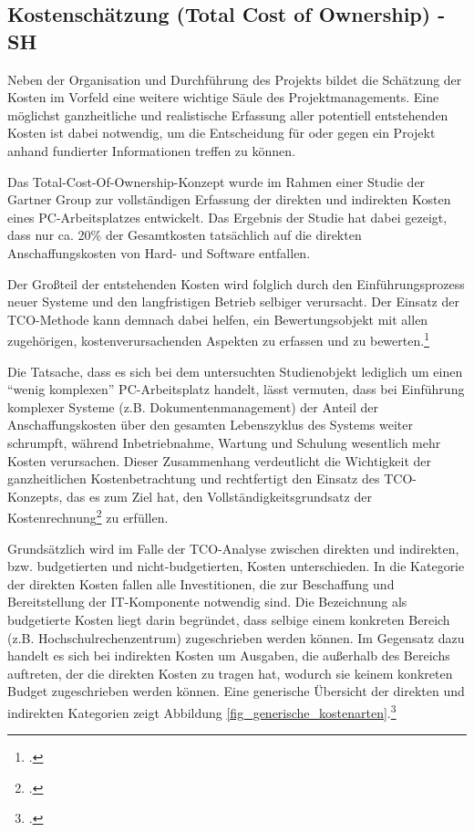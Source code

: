 
\subsection{Kostenschätzung (Total Cost of Ownership) - SH}
\label{subsection_kostenschatzung_TCO}
Neben der Organisation und Durchführung des Projekts bildet die Schätzung der Kosten im Vorfeld 
eine weitere wichtige Säule des Projektmanagements. Eine möglichst ganzheitliche und realistische 
Erfassung aller potentiell entstehenden Kosten ist dabei notwendig, um die Entscheidung für oder 
gegen ein Projekt anhand fundierter Informationen treffen zu können.

Das Total-Cost-Of-Ownership-Konzept wurde im Rahmen einer Studie der Gartner Group 
zur vollständigen Erfassung der direkten und indirekten Kosten eines PC-Arbeitsplatzes 
entwickelt. Das Ergebnis der Studie hat dabei gezeigt, dass nur ca. 20\% der Gesamtkosten 
tatsächlich auf die direkten Anschaffungskosten von Hard- und Software entfallen. 

Der Großteil der entstehenden Kosten wird folglich durch den Einführungsprozess neuer 
Systeme und den langfristigen Betrieb selbiger verursacht. Der Einsatz der TCO-Methode 
kann demnach dabei helfen, ein Bewertungsobjekt mit allen zugehörigen, 
kostenverursachenden Aspekten zu erfassen und zu bewerten.\footcite{hansen_business_2009}

Die Tatsache, dass es sich bei dem untersuchten Studienobjekt lediglich um einen “wenig komplexen” PC-Arbeitsplatz handelt, lässt vermuten, dass bei Einführung komplexer Systeme (z.B. Dokumentenmanagement) der Anteil der Anschaffungskosten über den gesamten Lebenszyklus des Systems weiter schrumpft, während Inbetriebnahme, Wartung und Schulung wesentlich mehr Kosten verursachen. Dieser Zusammenhang verdeutlicht die Wichtigkeit der ganzheitlichen Kostenbetrachtung und rechtfertigt den Einsatz des TCO-Konzepts, das es zum Ziel hat, den Vollständigkeitsgrundsatz der Kostenrechnung\footcite{grob_einfuhrung_2004} zu erfüllen.

Grundsätzlich wird im Falle der TCO-Analyse zwischen direkten und indirekten, bzw. budgetierten und nicht-budgetierten, Kosten unterschieden. In die Kategorie der direkten Kosten fallen alle Investitionen, die zur Beschaffung und Bereitstellung der IT-Komponente notwendig sind. Die Bezeichnung als budgetierte Kosten liegt darin begründet, dass selbige einem konkreten Bereich (z.B. Hochschulrechenzentrum) zugeschrieben werden können. Im Gegensatz dazu handelt es sich bei indirekten Kosten um Ausgaben, die außerhalb des Bereichs auftreten, der die direkten Kosten zu tragen hat, wodurch sie keinem konkreten Budget zugeschrieben werden können. Eine generische Übersicht der direkten und indirekten Kategorien zeigt Abbildung \ref{fig_generische_kostenarten}.\footcite{hansen_business_2009}

